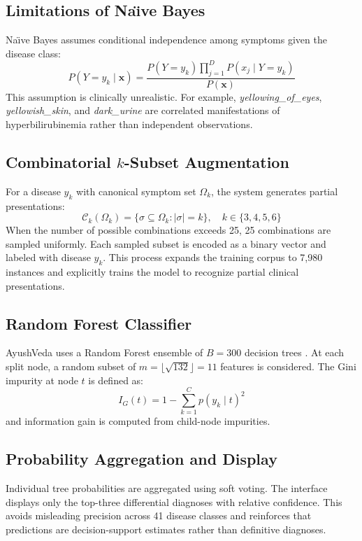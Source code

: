 \documentclass[conference]{IEEEtran}
\begin{document}
\subsection{Limitations of Na{\"\i}ve Bayes}
Na{\"\i}ve Bayes assumes conditional independence among symptoms given the disease class:
\begin{equation}
P(Y = y_k \mid \mathbf{x}) = \frac{P(Y = y_k) \prod_{j=1}^D P(x_j \mid Y = y_k)}{P(\mathbf{x})}
\end{equation}
This assumption is clinically unrealistic. For example, \textit{yellowing\_of\_eyes}, \textit{yellowish\_skin}, and \textit{dark\_urine} are correlated manifestations of hyperbilirubinemia rather than independent observations.

\subsection{Combinatorial $k$-Subset Augmentation}
For a disease $y_k$ with canonical symptom set $\Omega_k$, the system generates partial presentations:
\begin{equation}
\mathcal{C}_k(\Omega_k) = \{\sigma \subseteq \Omega_k : |\sigma| = k\}, \quad k \in \{3,4,5,6\}
\end{equation}
When the number of possible combinations exceeds 25, 25 combinations are sampled uniformly. Each sampled subset is encoded as a binary vector and labeled with disease $y_k$. This process expands the training corpus to 7,980 instances and explicitly trains the model to recognize partial clinical presentations.

\subsection{Random Forest Classifier}
AyushVeda uses a Random Forest ensemble of $B = 300$ decision trees \cite{breiman2001random, pedregosa2011scikit}. At each split node, a random subset of $m = \lfloor \sqrt{132} \rfloor = 11$ features is considered. The Gini impurity at node $t$ is defined as:
\begin{equation}
I_G(t) = 1 - \sum_{k=1}^C p(y_k \mid t)^2
\end{equation}
and information gain is computed from child-node impurities.

\subsection{Probability Aggregation and Display}
Individual tree probabilities are aggregated using soft voting. The interface displays only the top-three differential diagnoses with relative confidence. This avoids misleading precision across 41 disease classes and reinforces that predictions are decision-support estimates rather than definitive diagnoses.
\end{document}
